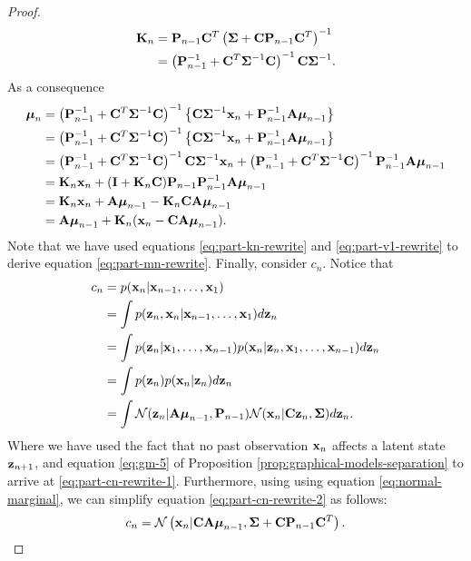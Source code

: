 \documentclass[11pt]{article}
\numberwithin{equation}{section}
\newcommand{\x}{{\bf x}}
\newcommand{\z}{{\bf z}}
\newcommand{\N}{\mathcal{N}}
\begin{document}
\begin{proof}
	\begin{align}
		{\bf K}_n &= {\bf P}_{n-1} {\bf C}^T\left(\boldsymbol\Sigma + {\bf C}{\bf P}_{n-1}{\bf C}^T\right)^{-1} \\
				  &= \left({\bf P}_{n-1}^{-1} + {\bf C}^T\boldsymbol\Sigma^{-1}{\bf C}\right)^{-1}{\bf C}\boldsymbol\Sigma^{-1}. \label{eq:part-kn-rewrite}
	\end{align}
	As a consequence
	\begin{align}
		\boldsymbol{\mu}_n &= \left({\bf P}_{n-1}^{-1} + {\bf C}^T \boldsymbol\Sigma^{-1}{\bf C}\right)^{-1} \left\{{\bf C}\boldsymbol\Sigma^{-1}\x_n + {\bf P}_{n-1}^{-1}{\bf A}\boldsymbol\mu_{n-1}\right\}\\
		&= \left({\bf P}_{n-1}^{-1} + {\bf C}^T \boldsymbol\Sigma^{-1}{\bf C}\right)^{-1} \left\{{\bf C}\boldsymbol\Sigma^{-1}\x_n + {\bf P}_{n-1}^{-1}{\bf A}\boldsymbol\mu_{n-1}\right\}\\
		&= \left({\bf P}_{n-1}^{-1} + {\bf C}^T \boldsymbol\Sigma^{-1}{\bf C}\right)^{-1} {\bf C}\boldsymbol\Sigma^{-1}\x_n + \left({\bf P}_{n-1}^{-1} + {\bf C}^T \boldsymbol\Sigma^{-1}{\bf C}\right)^{-1}{\bf P}_{n-1}^{-1}{\bf A}\boldsymbol\mu_{n-1}\\
		&= 	{\bf K}_n \x_n + ({\bf I} + {\bf K}_n {\bf C}){\bf P}_{n-1}{\bf P}_{n-1}^{-1}{\bf A}\boldsymbol\mu_{n-1} \label{eq:part-mn-rewrite}\\
		&= {\bf K}_n \x_n + {\bf A}\boldsymbol\mu_{n-1} - {\bf K}_n {\bf C}{\bf A}\boldsymbol\mu_{n-1}\\
		&= {\bf A}\boldsymbol{\mu}_{n-1} + {\bf K}_{n}(\x_n - {\bf CA}\boldsymbol\mu_{n-1}).
	\end{align}
	Note that we have used equations \eqref{eq:part-kn-rewrite} and \eqref{eq:part-v1-rewrite} to derive equation \eqref{eq:part-mn-rewrite}.
	Finally, consider $c_n$. Notice that
	\begin{align}
		c_n &= p(\x_n \vert \x_{n-1}, \ldots, \x_1)\\
			&= \int p(\z_n, \x_n \vert \x_{n-1}, \ldots, \x_1) d\z_n\\
			&= \int p(\z_n \vert \x_1, \ldots, \x_{n-1}) p (\x_n \vert \z_n, \x_1, \ldots, \x_{n-1}) d\z_n \\
			&= \int p(\z_n) p (\x_n \vert \z_n) d\z_n \label{eq:part-cn-rewrite-1} \\
			&= \int \N(\z_n\vert {\bf A} \boldsymbol\mu_{n-1}, {\bf P}_{n-1}) \N(\x_n \vert {\bf C}\z_n, \boldsymbol\Sigma) d\z_n. \label{eq:part-cn-rewrite-2}
	\end{align}
	Where we have used the fact that no past observation $\x_n$ affects a latent state $\z_{n+1}$, and equation \eqref{eq:gm-5} of Proposition \ref{prop:graphical-models-separation} to arrive at \eqref{eq:part-cn-rewrite-1}. Furthermore, using using equation \eqref{eq:normal-marginal}, we can  simplify equation \eqref{eq:part-cn-rewrite-2} as follows:
	\begin{equation}
		c_n = \N\left(\x_n \vert {\bf C}{\bf A}\boldsymbol\mu_{n-1}, \boldsymbol\Sigma + {\bf C}{\bf P}_{n-1}{\bf C}^T\right).
	\end{equation}	
\end{proof}
\end{document}
